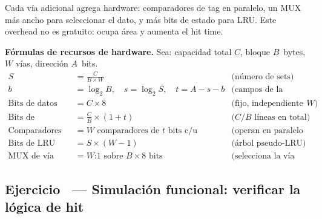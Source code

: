 \documentclass[12pt, a4paper]{article}
\newcounter{ejnum}
\newcommand{\ejerciciosec}[1]{%
  \stepcounter{ejnum}%
  \subsection{Ejercicio \theejnum\ — #1}%
}
\begin{document}
\vspace{0.3cm}

Cada vía adicional agrega hardware:
comparadores de tag en paralelo, un MUX más ancho para
seleccionar el dato, y más bits de estado para LRU.
Este overhead no es gratuito: ocupa área y aumenta el hit time.
\newpage
\begin{referencia}
    \textbf{Fórmulas de recursos de hardware.}
    Sea: capacidad total $C$, bloque $B$~bytes, $W$ vías, dirección $A$~bits.
    \begin{align*}
        S &= \frac{C}{B \times W}
        & \text{(número de sets)} \\[4pt]
        b &= \log_2 B,\quad s = \log_2 S,\quad t = A - s - b
        & \text{(campos de la dirección)} \\[4pt]
        \text{Bits de datos} &= C \times 8
        & \text{(fijo, independiente de } W\text{)} \\[4pt]
        \text{Bits de tag+valid} &= \frac{C}{B} \times (1 + t)
        & \text{(} C/B \text{ líneas en total)} \\[4pt]
        \text{Comparadores} &= W \text{ comparadores de } t \text{ bits c/u}
        & \text{(operan en paralelo por set)} \\[4pt]
        \text{Bits de LRU (PLRU)} &= S \times (W - 1)
        & \text{(árbol pseudo-LRU)} \\[4pt]
        \text{MUX de vía} &= W\text{:}1 \text{ sobre } B\times 8 \text{ bits}
        & \text{(selecciona la vía ganadora)}
    \end{align*}

\end{referencia}

\ejerciciosec{Simulación funcional: verificar la lógica de hit}
\end{document}
